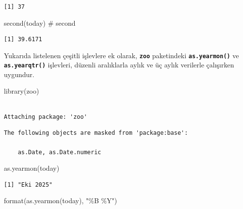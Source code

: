 \documentclass[
  letterpaper,
  DIV=11,
  numbers=noendperiod]{scrreprt}
\newenvironment{Shaded}{\begin{snugshade}}{\end{snugshade}}
\newcommand{\CommentTok}[1]{\textcolor[rgb]{0.37,0.37,0.37}{#1}}
\newcommand{\FunctionTok}[1]{\textcolor[rgb]{0.28,0.35,0.67}{#1}}
\newcommand{\NormalTok}[1]{\textcolor[rgb]{0.00,0.23,0.31}{#1}}
\newcommand{\StringTok}[1]{\textcolor[rgb]{0.13,0.47,0.30}{#1}}
\begin{document}
\begin{verbatim}
[1] 37
\end{verbatim}

\begin{Shaded}
\begin{Highlighting}[]
\FunctionTok{second}\NormalTok{(today) }\CommentTok{\# second}
\end{Highlighting}
\end{Shaded}

\begin{verbatim}
[1] 39.6171
\end{verbatim}

Yukarıda listelenen çeşitli işlevlere ek olarak, \textbf{\texttt{zoo}}
paketindeki \textbf{\texttt{as.yearmon()}} ve
\textbf{\texttt{as.yearqtr()}} işlevleri, düzenli aralıklarla aylık ve
üç aylık verilerle çalışırken uygundur.

\begin{Shaded}
\begin{Highlighting}[]
\FunctionTok{library}\NormalTok{(zoo)}
\end{Highlighting}
\end{Shaded}

\begin{verbatim}

Attaching package: 'zoo'
\end{verbatim}

\begin{verbatim}
The following objects are masked from 'package:base':

    as.Date, as.Date.numeric
\end{verbatim}

\begin{Shaded}
\begin{Highlighting}[]
\FunctionTok{as.yearmon}\NormalTok{(today)}
\end{Highlighting}
\end{Shaded}

\begin{verbatim}
[1] "Eki 2025"
\end{verbatim}

\begin{Shaded}
\begin{Highlighting}[]
\FunctionTok{format}\NormalTok{(}\FunctionTok{as.yearmon}\NormalTok{(today), }\StringTok{"\%B \%Y"}\NormalTok{)}
\end{Highlighting}
\end{Shaded}
\end{document}
